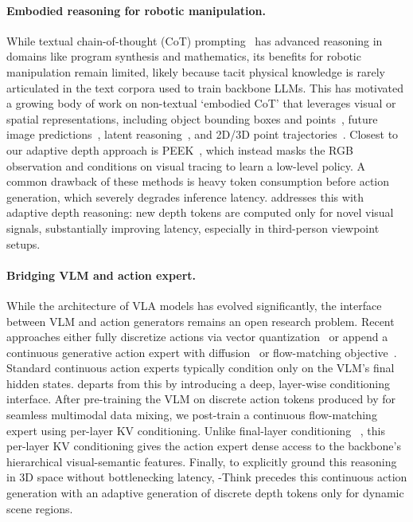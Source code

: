 \paragraph{Embodied reasoning for robotic manipulation.}
While textual chain-of-thought (CoT) prompting~\citep{wei2022chain} has advanced reasoning in domains like program synthesis and mathematics, its benefits for robotic manipulation remain limited, likely because tacit physical knowledge is rarely articulated in the text corpora used to train backbone LLMs.
This has motivated a growing body of work on non-textual `embodied CoT' that leverages visual or spatial representations, including object bounding boxes and points~\citep{zawalski2024robotic,yuan2024robopoint,li2025hamster}, future image predictions~\citep{zhao2025cot}, latent reasoning~\citep{tur2026recurrent}, and 2D/3D point trajectories~\citep{sun2024emma,huang2025thinkact,lee2025molmoactactionreasoningmodels}.
Closest to our adaptive depth approach is PEEK~\citep{zhang2025peek}, which instead masks the RGB observation and conditions on visual tracing to learn a low-level policy.
A common drawback of these methods is heavy token consumption before action generation, which severely degrades inference latency.
\molmothink addresses this with adaptive depth reasoning: new depth tokens are computed only for novel visual signals, substantially improving latency, especially in third-person viewpoint setups.

\paragraph{Bridging VLM and action expert.}
While the architecture of VLA models has evolved significantly, the interface between VLM and action generators remains an open research problem.
Recent approaches either fully discretize actions via vector quantization~\citep{brohan2022rt,kim2024openvla,pertsch2025fast} or append a continuous generative action expert with diffusion~\citep{chi2025diffusion} or flow-matching objective~\citep{Lipman2022FlowModeling,black2410pi0}.
Standard continuous action experts typically condition only on the VLM's final hidden states.
\molmoactt{} departs from this by introducing a deep, layer-wise conditioning interface.
After pre-training the VLM on discrete action tokens produced by \molmoactfast for seamless multimodal data mixing, we post-train a continuous flow-matching expert using per-layer KV conditioning.
Unlike final-layer conditioning ~\citep{gr00tn1_2025,wang2026vla}, this per-layer KV conditioning gives the action expert dense access to the backbone's hierarchical visual-semantic features.
Finally, to explicitly ground this reasoning in 3D space without bottlenecking latency, \molmoactt-Think precedes this continuous action generation with an adaptive generation of discrete depth tokens only for dynamic scene regions.
